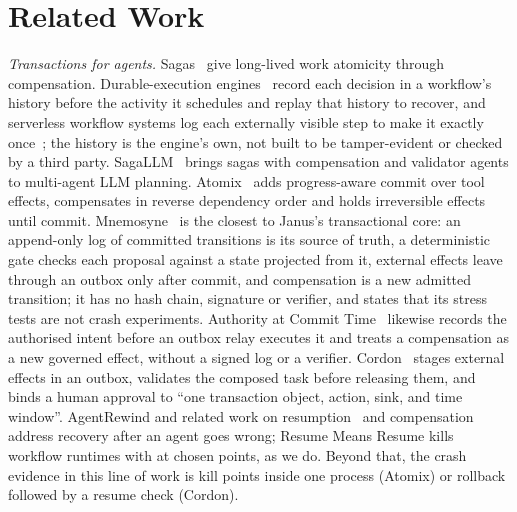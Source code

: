\section{Related Work}
\label{sec:related}

\emph{Transactions for agents.} Sagas~\cite{sagas} give long-lived work
atomicity through compensation. Durable-execution engines~\cite{temporal}
record each decision in a workflow's history before the activity it schedules
and replay that history to recover, and serverless workflow systems log each
externally visible step to make it exactly once~\cite{beldi,boki}; the history is
the engine's own, not built to be tamper-evident or checked by a third party.
SagaLLM~\cite{sagallm} brings sagas with compensation and validator agents to
multi-agent LLM planning. Atomix~\cite{atomix} adds progress-aware commit over
tool effects, compensates in reverse dependency order and holds irreversible
effects until commit. Mnemosyne~\cite{mnemosyne} is the closest to Janus's
transactional core: an append-only log of committed transitions is its source of
truth, a deterministic gate checks each proposal against a state projected from
it, external effects leave through an outbox only after commit, and compensation
is a new admitted transition; it has no hash chain, signature or verifier, and
states that its stress tests are not crash experiments. Authority at Commit
Time~\cite{authoritycommit} likewise records the authorised intent before an
outbox relay executes it and treats a compensation as a new governed effect,
without a signed log or a verifier. Cordon~\cite{cordon} stages external effects
in an outbox, validates the composed task before releasing them, and binds a
human approval to ``one transaction object, action, sink, and time window''.
AgentRewind and related work on resumption~\cite{agentrewind,saferesume,resumemeansresume}
and compensation~\cite{rac} address recovery after an agent goes wrong; Resume
Means Resume kills workflow runtimes with  at chosen points, as we
do. Beyond that, the crash evidence in this line of work is kill points inside
one process (Atomix) or rollback followed by a resume check (Cordon).

